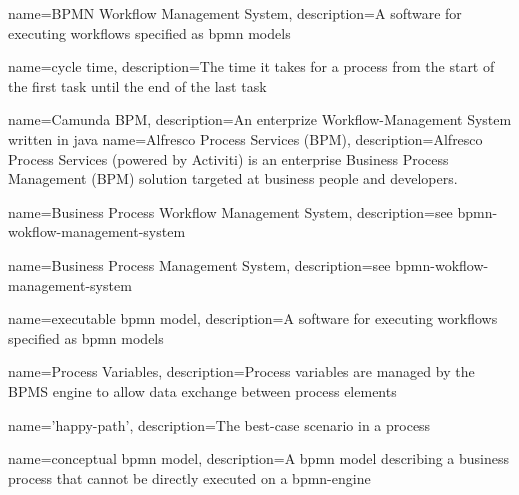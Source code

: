 
{
	name={BPMN Workflow Management System},
	description={A software for executing workflows specified as \gls{bpmn} models}
}

{
	name={cycle time},
	description={The time it takes for a process from the start of the first task until the end of the last task \cite{Six-sigma-terms}}
}

{
	name={Camunda BPM},
	description={An enterprize Workflow-Management System written in java \cite{camunda-description}}
}
{
	name={Alfresco Process Services (BPM)},
	description={Alfresco Process Services (powered by Activiti) is an enterprise Business Process Management (BPM) solution targeted at business people and developers. \cite{alfresco-description}}
}


{
	name={Business Process Workflow Management System},
	description={see \gls{bpmn-wokflow-management-system}}
}

{
	name={Business Process Management System},
	description={see \gls{bpmn-wokflow-management-system}}
}

{
	name={executable \gls{bpmn} model},
	description={A software for executing workflows specified as \gls{bpmn} models}
}

{
	name={Process Variables},
	description={Process variables are managed by the BPMS engine to allow data exchange between process elements}
}

{
	name={'happy-path'},
	description={The best-case scenario in a process}
}

{
	name={conceptual \gls{bpmn} model},
	description={A \gls{bpmn} model describing a business process that cannot be directly executed on a \gls{bpmn-engine}}
}

